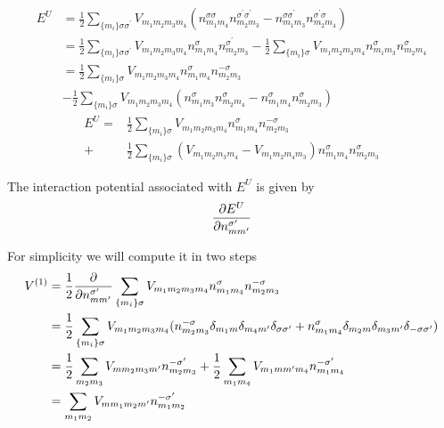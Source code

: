 \begin{equation*}
\begin{split}
E^U&=\frac{1}{2}\sum_{\{m_i\}\sigma\sigma^\prime}V_{m_1m_2m_3m_4}
(n_{m_1m_4}^{\sigma\sigma}n_{m_2m_3}^{\sigma^\prime\sigma^\prime}-
n_{m_1m_3}^{\sigma\sigma^\prime}n_{m_2m_4}^{\sigma^\prime\sigma})\\
&=\frac{1}{2}\sum_{\{m_i\}\sigma\sigma^\prime}V_{m_1m_2m_3m_4}
n_{m_1m_4}^{\sigma}n_{m_2m_3}^{\sigma^\prime}-\frac{1}{2}\sum_{\{m_i\}\sigma}V_{m_1m_2m_3m_4}
n_{m_1m_3}^{\sigma}n_{m_2m_4}^{\sigma}\\
&=\frac{1}{2}\sum_{\{m_i\}\sigma}V_{m_1m_2m_3m_4}n_{m_1m_4}^{\sigma}n_{m_2m_3}^{-\sigma}\\&-
\frac{1}{2}\sum_{\{m_i\}\sigma}V_{m_1m_2m_3m_4}
(n_{m_1m_3}^{\sigma}n_{m_2m_4}^{\sigma}-n_{m_1m_4}^{\sigma}n_{m_2m_3}^{\sigma})
\end{split}
\end{equation*}
\begin{equation}
\label{Eu}
\begin{split}
E^U=&\frac{1}{2}\sum_{\{m_i\}\sigma}V_{m_1m_2m_3m_4}n_{m_1m_4}^{\sigma}n_{m_2m_3}^{-\sigma}\\+&
\frac{1}{2}\sum_{\{m_i\}\sigma}(V_{m_1m_2m_3m_4}-V_{m_1m_2m_4m_3})
n_{m_1m_4}^{\sigma}n_{m_2m_3}^{\sigma}
\end{split}
\end{equation}
%
\par{The interaction potential associated with $E^U$ is given by}
\begin{equation*}
\frac{\partial E^U}{\partial n_{mm^\prime}^{\sigma^\prime}}
\end{equation*}
%
\par{For simplicity we will compute it in two steps}
%
\begin{equation}
\begin{split}
V^{(1)}&=\frac{1}{2}\frac{\partial }{\partial n_{mm^\prime}^{\sigma^\prime}}\sum_{\{m_i\}\sigma}V_{m_1m_2m_3m_4}n_{m_1m_4}^{\sigma}n_{m_2m_3}^{-\sigma}\\
&=\frac{1}{2}\sum_{\{m_i\}\sigma}V_{m_1m_2m_3m_4}(n_{m_2m_3}^{-\sigma}\delta_{m_1m}\delta_{m_4m^\prime}\delta_{\sigma\sigma^\prime}
+n_{m_1m_4}^{\sigma}\delta_{m_2m}\delta_{m_3m^\prime}\delta_{-\sigma\sigma^\prime})\\
&=\frac{1}{2}\sum_{m_2m_3}V_{mm_2m_3m^{\prime}}n_{m_2m_3}^{-\sigma^{\prime}}
+\frac{1}{2}\sum_{m_1m_4}V_{m_1mm^{\prime}m_4}n_{m_1m_4}^{-\sigma^{\prime}}\\
&=\sum_{m_1m_2}V_{mm_1m_2m^{\prime}}n_{m_1m_2}^{-\sigma^{\prime}}
\end{split}
\end{equation}
